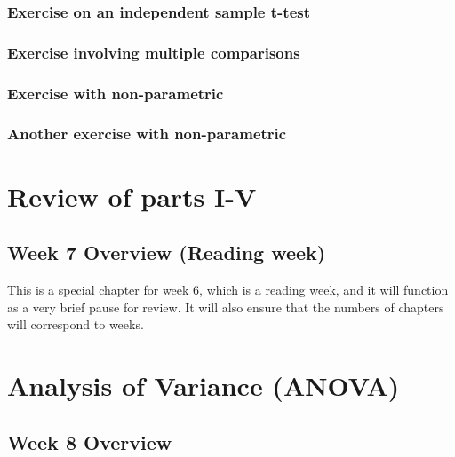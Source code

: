 \documentclass[
]{scrbook}
\begin{document}
\hypertarget{exercise-on-an-independent-sample-t-test}{%
\section{Exercise on an independent sample t-test}\label{exercise-on-an-independent-sample-t-test}}

\hypertarget{exercise-involving-multiple-comparisons}{%
\section{Exercise involving multiple comparisons}\label{exercise-involving-multiple-comparisons}}

\hypertarget{exercise-with-non-parametric}{%
\section{Exercise with non-parametric}\label{exercise-with-non-parametric}}

\hypertarget{another-exercise-with-non-parametric}{%
\section{Another exercise with non-parametric}\label{another-exercise-with-non-parametric}}

\hypertarget{part-review-of-parts-i-v}{%
\part{Review of parts I-V}\label{part-review-of-parts-i-v}}

\hypertarget{Week7}{%
\chapter*{Week 7 Overview (Reading week)}\label{Week7}}

This is a special chapter for week 6, which is a reading week, and it will function as a very brief pause for review. It will also ensure that the numbers of chapters will correspond to weeks.

\hypertarget{part-analysis-of-variance-anova}{%
\part{Analysis of Variance (ANOVA)}\label{part-analysis-of-variance-anova}}

\hypertarget{Week8}{%
\chapter*{Week 8 Overview}\label{Week8}}
\end{document}
